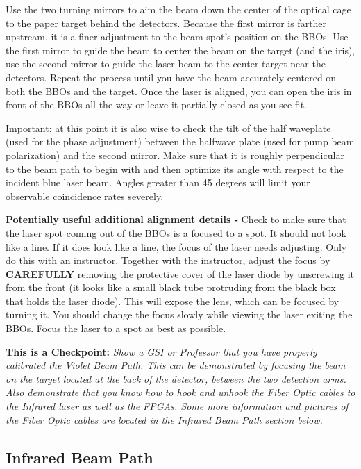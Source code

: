 \documentclass{../lab}
\begin{document}
Use the two turning mirrors to aim the beam down the center of the optical cage to the paper target behind the detectors. Because the first mirror is farther upstream, it is a finer adjustment to the beam spot's position on the BBOs. Use the first mirror to guide the beam to center the beam on the target (and the iris), use the second mirror to guide the laser beam to the center target near the detectors. Repeat the process until you have the beam accurately centered on both the BBOs and the target. Once the laser is aligned, you can open the iris in front of the BBOs all the way or leave it partially closed as you see fit.

Important: at this point it is also wise to check the tilt of the half waveplate (used for the phase adjustment) between the halfwave plate (used for pump beam polarization) and the second mirror. Make sure that it is roughly perpendicular to the beam path to begin with and then optimize its angle with respect to the incident blue laser beam. Angles greater than 45 degrees will limit your observable coincidence rates severely.

\textbf{Potentially useful additional alignment details -} Check to make sure that the laser spot coming out of the BBOs is a focused to a spot. It should not look like a line. If it does look like a line, the focus of the laser needs adjusting. Only do this with an instructor. Together with the instructor, adjust the focus by \textbf{CAREFULLY} removing the protective cover of the laser diode by unscrewing it from the front (it looks like a small black tube protruding from the black box that holds the laser diode). This will expose the lens, which can be focused by turning it. You should change the focus slowly while viewing the laser exiting the BBOs. Focus the laser to a spot as best as possible.


\textbf{This is a Checkpoint:} \emph{Show a GSI or Professor that you have properly calibrated the Violet Beam Path. This can be demonstrated by focusing the beam on the target located at the back of the detector, between the two detection arms. Also demonstrate that you know how to hook and unhook the Fiber Optic cables to the Infrared laser as well as the FPGAs. Some more information and pictures of the Fiber Optic cables are located in the Infrared Beam Path section below.}

\subsection{Infrared Beam Path}
\end{document}

